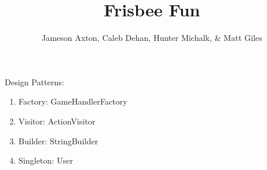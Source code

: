 \documentclass[12pt]{"article"}
\author{\Large Jameson Axton, Caleb Dehan, Hunter Michalk, \& Matt Giles}
\title{Frisbee Fun}
\begin{document}
	\maketitle
	Design Patterns: 
	\begin{enumerate}
		\item Factory: GameHandlerFactory
		\item Visitor: ActionVisitor
		\item Builder: StringBuilder
		\item Singleton: User
	\end{enumerate}
\end{document}
